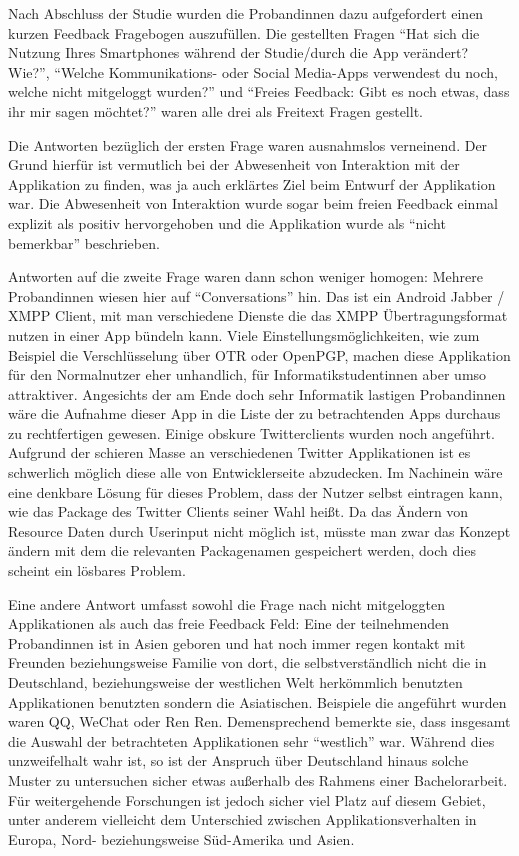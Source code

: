 Nach Abschluss der Studie wurden die Probandinnen dazu aufgefordert einen kurzen Feedback Fragebogen auszufüllen.
Die gestellten Fragen "`Hat sich die Nutzung Ihres Smartphones während der Studie/durch die App verändert? Wie?"', "`Welche Kommunikations- oder Social Media-Apps verwendest du noch, welche nicht mitgeloggt wurden?"' und "`Freies Feedback: Gibt es noch etwas, dass ihr mir sagen möchtet?"' waren alle drei als Freitext Fragen gestellt.
\par
Die Antworten bezüglich der ersten Frage waren ausnahmslos verneinend.
Der Grund hierfür ist vermutlich bei der Abwesenheit von Interaktion mit der Applikation zu finden, was ja auch erklärtes Ziel beim Entwurf der Applikation war.
Die Abwesenheit von Interaktion wurde sogar beim freien Feedback einmal explizit als positiv hervorgehoben und die Applikation wurde als "`nicht bemerkbar"' beschrieben.
\par
Antworten auf die zweite Frage waren dann schon weniger homogen:
Mehrere Probandinnen wiesen hier auf "`Conversations"' hin. 
Das ist ein Android Jabber / XMPP Client, mit man verschiedene Dienste die das XMPP Übertragungsformat nutzen in einer App bündeln kann.
Viele Einstellungsmöglichkeiten, wie zum Beispiel die Verschlüsselung über OTR oder OpenPGP, machen diese Applikation für den Normalnutzer eher unhandlich, für Informatikstudentinnen aber umso attraktiver.
Angesichts der am Ende doch sehr Informatik lastigen Probandinnen wäre die Aufnahme dieser App in die Liste der zu betrachtenden Apps durchaus zu rechtfertigen gewesen.
Einige obskure Twitterclients wurden noch angeführt.
Aufgrund der schieren Masse an verschiedenen Twitter Applikationen ist es schwerlich möglich diese alle von Entwicklerseite abzudecken. 
Im Nachinein wäre eine denkbare Lösung für dieses Problem, dass der Nutzer selbst eintragen kann, wie das Package des Twitter Clients seiner Wahl heißt.
Da das Ändern von Resource Daten durch Userinput nicht möglich ist, müsste man zwar das Konzept ändern mit dem die relevanten Packagenamen gespeichert werden, doch dies scheint ein lösbares Problem.
\par
Eine andere Antwort umfasst sowohl die Frage nach nicht mitgeloggten Applikationen als auch das freie Feedback Feld:
Eine der teilnehmenden Probandinnen ist in Asien geboren und hat noch immer regen kontakt mit Freunden beziehungsweise Familie von dort, 
die selbstverständlich nicht die in Deutschland, beziehungsweise der westlichen Welt herkömmlich benutzten Applikationen benutzten sondern die Asiatischen.
Beispiele die angeführt wurden waren QQ, WeChat oder Ren Ren.
Demensprechend bemerkte sie, dass insgesamt die Auswahl der betrachteten Applikationen sehr "`westlich"' war.
Während dies unzweifelhalt wahr ist, so ist der Anspruch über Deutschland hinaus solche Muster zu untersuchen sicher etwas außerhalb des Rahmens einer Bachelorarbeit.
Für weitergehende Forschungen ist jedoch sicher viel Platz auf diesem Gebiet, unter anderem vielleicht dem Unterschied zwischen Applikationsverhalten in Europa, Nord- beziehungsweise Süd-Amerika und Asien. 
\par

